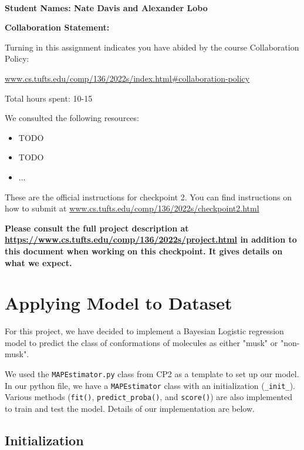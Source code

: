 \documentclass[12pt]{article}
\begin{document}
~~\\ %

\begin{center}
{\Large{\bf Student Names: Nate Davis and Alexander Lobo}}
\end{center}

{\Large{\bf Collaboration Statement:}}

Turning in this assignment indicates you have abided by the course Collaboration Policy:

\url{www.cs.tufts.edu/comp/136/2022s/index.html#collaboration-policy}

Total hours spent: 10-15

We consulted the following resources:
\begin{itemize}
\item TODO
\item TODO
\item $\ldots$	
\end{itemize}

\newpage

These are the official instructions for checkpoint 2.  You can find instructions on how to submit at \url{www.cs.tufts.edu/comp/136/2022s/checkpoint2.html}

\textbf{Please consult the full project description at \url{https://www.cs.tufts.edu/comp/136/2022s/project.html} in addition to this document when working on this checkpoint.  It gives details on what we expect.}

\section{Applying Model to Dataset}

For this project, we have decided to implement a Bayesian Logistic regression model to predict the class of conformations of molecules as either "musk" or "non-musk".

We used the \texttt{MAPEstimator.py} class from CP2 as a template to set up our model. In our python file, we have a \texttt{MAPEstimator} class with an initialization (\texttt{\_init\_}). Various methods (\texttt{fit()}, \texttt{predict\_proba()}, and \texttt{score()}) are also implemented to train and test the model. Details of our implementation are below.

\subsection{Initialization}
\end{document}
